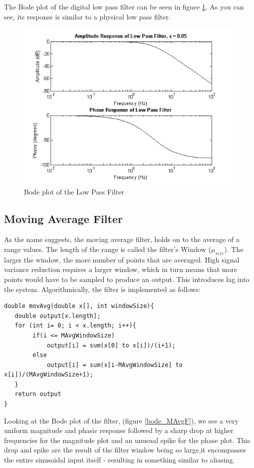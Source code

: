 \documentclass{article}
\theoremstyle{plain}
\theoremstyle{definition}
\theoremstyle{remark}
\begin{document}
The Bode plot of the digital low pass filter can be seen in figure \ref{bode_LPF}. As you can see, its response is similar to a physical low pass filter. 


\begin{figure}[hbt]
\begin{center}
\includegraphics[width = 11cm]{bode_LPF}
\caption{Bode plot of the Low Pass Filter}
\label{bode_LPF}
\end{center}
\end{figure}

\clearpage



\subsection{Moving Average Filter}
As the name suggests, the moving average filter, holds on to the average of a range values. The length of the range is called the filter's Window ($\mu_{size}$). The larger the window, the more number of points that are averaged. High signal variance reduction requires a larger window, which in turn means that more points would have to be sampled to produce an output. This introduces lag into the system. Algorithmically, the filter is implemented as follows:

\begin{verbatim}
double movAvg(double x[], int windowSize){
   double output[x.length];   
   for (int i= 0; i < x.length; i++){
        if(i <= MAvgWindowSize)
            output[i] = sum(x[0] to x[i])/(i+1);
        else
            output[i] = sum(x[i-MAvgWindowSize] to x[i])/(MAvgWindowSize+1);
   }
   return output
}
\end{verbatim}

Looking at the Bode plot of the filter, (figure \ref{bode_MAvgF}), we see a very uniform magnitude and phasic response followed by a sharp drop at higher frequencies for the magnitude plot and an unusual spike for the phase plot. This drop and spike are the result of the filter window being so large,it encompasses the entire sinusoidal input itself - resulting in something similar to aliasing.
\end{document}

